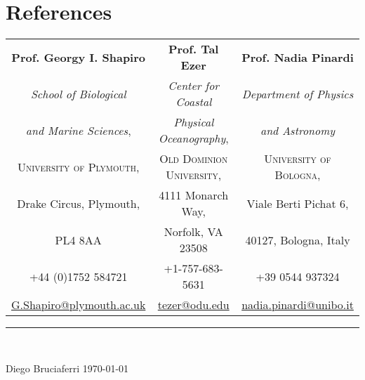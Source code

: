 \documentclass[a4paper, oneside, final]{scrartcl}
\begin{document}
\section{References}
\bigskip
\noindent
\begin{tabularx}{0.97\linewidth}{c|c|c}

\textbf{Prof. Georgy I. Shapiro}      & \textbf{Prof. Tal Ezer}            & \textbf{Prof. Nadia Pinardi}\\
\textit{School of Biological}         & \textit{Center for Coastal}        & \textit{Department of Physics} \\
\textit{and Marine Sciences},         & \textit{Physical Oceanography},    & \textit{and Astronomy} \\
\textsc{University of Plymouth},      & \textsc{Old Dominion University},  & \textsc{University of Bologna},\\
Drake Circus, Plymouth,               & 4111 Monarch Way,                  & Viale Berti Pichat 6, \\ 
PL4 8AA                               & Norfolk, VA 23508                  & 40127, Bologna, Italy \\
+44 (0)1752 584721                    & +1-757-683-5631                    & +39 0544 937324 \\
\href{mailto:G.Shapiro@plymouth.ac.uk}{G.Shapiro@plymouth.ac.uk} & \href{mailto:tezer@odu.edu}{tezer@odu.edu} & \href{mailto:nadia.pinardi@unibo.it}{nadia.pinardi@unibo.it}\\
\end{tabularx}

\begin{center}
\noindent\rule{16.2cm}{1pt}\\
\end{center}
\bigskip


Diego Bruciaferri \hspace{8cm} \today
\end{document}
